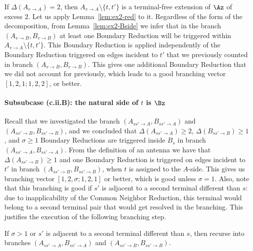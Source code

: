 If $\Delta(A_{v\to A})=2$, then $A_{v\to A}\setminus \{t,t'\}$ is a terminal-free extension of $\Az$ of excess $2$. Let us apply Lemma~\ref{lem:ex2-red} to it. Regardless of the form of the decomposition, from Lemma~\ref{lem:ex2-Bside} we infer that in the branch $(A_{v\to B},B_{v\to B})$ at least one Boundary Reduction will be triggered within $A_{v\to A}\setminus \{t,t'\}$. This Boundary Reduction is applied independently of the Boundary Reduction triggered on edges incident to $t'$ that we previously counted in branch $(A_{v\to B},B_{v\to B})$. This gives one additional Boundary Reduction that we did not account for previously, which leads to a good branching vector $[1,2,1;1,2,2]$, or better.









\paragraph*{Subsubcase (c.ii.B): the natural side of $t$ is $\Bz$}

Recall that we investigated the branch $(A_{ss'\to A},B_{ss'\to A})$ and $(A_{ss'\to B},B_{ss'\to B})$, and we concluded that $\Delta(A_{ss'\to A})\geq 2$, $\Delta(B_{ss'\to B})\geq 1$, and $\sigma\geq 1$ Boundary Reductions are triggered inside $B_s$ in branch $(A_{ss'\to A},B_{ss'\to A})$. From the definition of an antenna we have that $\Delta(A_{ss'\to B})\geq 1$ and one Boundary Reduction is triggered on edges incident to $t'$ in branch $(A_{ss'\to B},B_{ss'\to B})$, when $t$ is assigned to the $A$-side. This gives us branching vector $[1,2,\sigma;1,2,1]$ or better, which is good unless $\sigma=1$. 
Also, note that this branching is good if $s'$ is adjacent to a second terminal different than $s$: due to inapplicability
of the Common Neighbor Reduction, this terminal would belong to a second terminal pair that would get resolved
in the branching.
This justifies the execution of the following branching step.

\begin{branching}
If $\sigma > 1$ or $s'$ is adjacent to a second terminal different than $s$,
then recurse into branches $(A_{ss'\to A},B_{ss'\to A})$ and $(A_{ss'\to B},B_{ss'\to B})$.
\end{branching}



